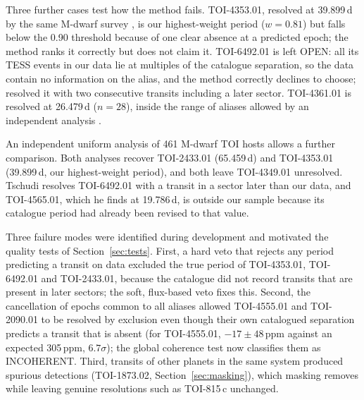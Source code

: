 \documentclass[fleqn,usenatbib]{mnras}
\begin{document}
Three further cases test how the method fails. TOI-4353.01, resolved at 39.899\,d by the same M-dwarf survey \citep{Tschudi2026b}, is our highest-weight period ($w = 0.81$) but falls below the 0.90 threshold because of one clear absence at a predicted epoch; the method ranks it correctly but does not claim it. TOI-6492.01 \citep[published at 33.265\,d;][]{Tschudi2026b} is left OPEN: all its TESS events in our data lie at multiples of the catalogue separation, so the data contain no information on the alias, and the method correctly declines to choose; \citet{Tschudi2026b} resolved it with two consecutive transits including a later sector. TOI-4361.01 is resolved at 26.479\,d ($n = 28$), inside the range of aliases allowed by an independent analysis \citep[between $\Delta/34$ and $\Delta/21$;][]{Mantovan2022}.

An independent uniform analysis of 461 M-dwarf TOI hosts \citep{Tschudi2026b} allows a further comparison. Both analyses recover TOI-2433.01 (65.459\,d) and TOI-4353.01 (39.899\,d, our highest-weight period), and both leave TOI-4349.01 unresolved. Tschudi resolves TOI-6492.01 with a transit in a sector later than our data, and TOI-4565.01, which he finds at 19.786\,d, is outside our sample because its catalogue period had already been revised to that value.

Three failure modes were identified during development and motivated the quality tests of Section~\ref{sec:tests}. First, a hard veto that rejects any period predicting a transit on data excluded the true period of TOI-4353.01, TOI-6492.01 and TOI-2433.01, because the catalogue did not record transits that are present in later sectors; the soft, flux-based veto fixes this. Second, the cancellation of epochs common to all aliases allowed TOI-4555.01 and TOI-2090.01 to be resolved by exclusion even though their own catalogued separation predicts a transit that is absent (for TOI-4555.01, $-17 \pm 48$\,ppm against an expected 305\,ppm, $6.7\sigma$); the global coherence test now classifies them as INCOHERENT. Third, transits of other planets in the same system produced spurious detections (TOI-1873.02, Section~\ref{sec:masking}), which masking removes while leaving genuine resolutions such as TOI-815\,c unchanged.
\end{document}
